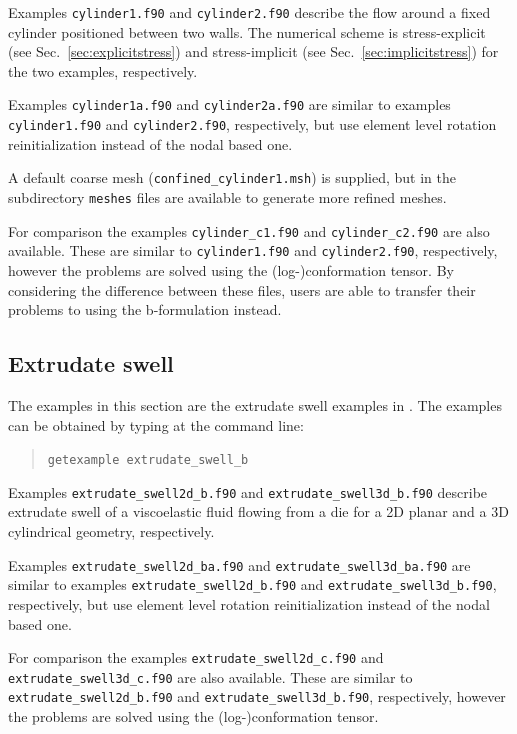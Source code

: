 Examples \texttt{cylinder1.f90} and \texttt{cylinder2.f90} describe the flow
around a fixed cylinder positioned between two walls. The numerical scheme is
stress-explicit (see Sec.~\ref{sec:explicitstress}) and stress-implicit (see
Sec.~\ref{sec:implicitstress}) for the two examples, respectively.

Examples \texttt{cylinder1a.f90} and \texttt{cylinder2a.f90} are similar to examples \texttt{cylinder1.f90} and \texttt{cylinder2.f90}, respectively, but use element level rotation reinitialization instead of the nodal based one.

A default coarse mesh (\texttt{confined\_cylinder1.msh}) is supplied, but in the
subdirectory \texttt{meshes} files are available to generate more refined 
meshes.

For comparison the examples \texttt{cylinder\_c1.f90} and \texttt{cylinder\_c2.f90} are also available.
These are similar to \texttt{cylinder1.f90} and \texttt{cylinder2.f90}, respectively, however 
the problems are solved using the (log-)conformation tensor. By considering the difference between these files, users are able to transfer their problems to using the b-formulation instead.

\subsection{Extrudate swell}

The examples in this section are the extrudate swell examples in \cite{hulsen_numerical_2021}.
The examples can be obtained by typing at the command line:
\begin{quote}
   \texttt{getexample extrudate\_swell\_b}
\end{quote}

Examples \texttt{extrudate\_swell2d\_b.f90} and \texttt{extrudate\_swell3d\_b.f90} describe extrudate swell 
of a viscoelastic fluid flowing from a die for a 2D planar and a 3D cylindrical geometry, respectively.

Examples \texttt{extrudate\_swell2d\_ba.f90} and \texttt{extrudate\_swell3d\_ba.f90} are similar to examples \texttt{extrudate\_swell2d\_b.f90} and \texttt{extrudate\_swell3d\_b.f90}, respectively, but use element level rotation reinitialization instead of the nodal based one.

For comparison the examples \texttt{extrudate\_swell2d\_c.f90} and \texttt{extrudate\_swell3d\_c.f90} are also available.
These are similar to \texttt{extrudate\_swell2d\_b.f90} and \texttt{extrudate\_swell3d\_b.f90}, respectively, however 
the problems are solved using the (log-)conformation tensor. 

